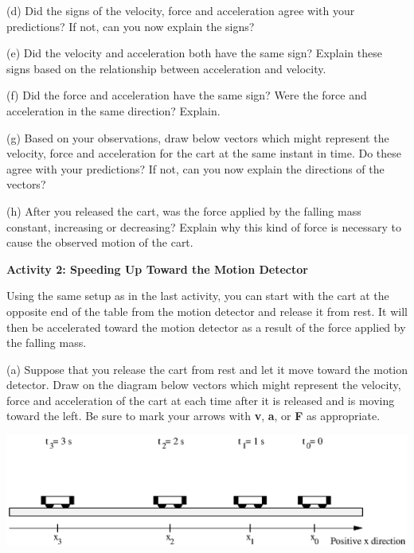 (d) Did the signs of the velocity, force and acceleration agree with your predictions?
If not, can you now explain the signs?
\vspace{20mm}

(e) Did the velocity and acceleration both have the same sign? Explain these
signs based on the relationship between acceleration and velocity.
\vspace{20mm}

(f) Did the force and acceleration have the same sign? Were the force and acceleration
in the same direction? Explain.
\vspace{20mm}

(g) Based on your observations, draw below vectors which might represent the
velocity, force and acceleration for the cart at the same instant in time. Do
these agree with your predictions? If not, can you now explain the directions
of the vectors?
\vspace{20mm}

(h) After you released the cart, was the force applied by the falling mass constant,
increasing or decreasing? Explain why this kind of force is necessary to cause
the observed motion of the cart.
\vspace{20mm}

\textbf{Activity 2: Speeding Up Toward the Motion Detector }

Using the same setup as in the last activity, you can start with the cart at
the opposite end of the table from the motion detector and release it from rest.
It will then be accelerated toward the motion detector as a result of the force
applied by the falling mass.

(a) Suppose that you release the cart from rest and let it move toward the motion
detector. Draw on the diagram below vectors which might represent the velocity,
force and acceleration of the cart at each time after it is released and is
moving toward the left. Be sure to mark your arrows with \textbf{v}, \textbf{a},
or \textbf{F} as appropriate.

\vspace{0.3cm}
{\par\centering \includegraphics{force2_fig5.eps} \par}
\vspace{0.3cm}

